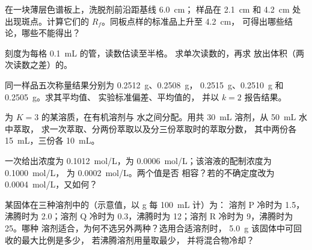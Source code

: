 \begin{exercise}[$\star$]\label{exo:b1:lab-techniques-1:3}
在一块薄层色谱板上，洗脱剂前沿距基线 \qty{6.0}{cm}；
样品在 \qty{2.1}{cm} 和 \qty{4.2}{cm} 处出现斑点。计算它们的
$R_f$。同板点样的标准品上升至 \qty{4.2}{cm}，
可得出哪些结论，哪些不能得出？
\end{exercise}

\begin{exercise}[$\star$]\label{exo:b1:lab-techniques-1:4}
刻度为每格 \qty{0.1}{mL} 的管，读数估读至半格。
求单次读数的，再求
放出体积（两次读数之差）的。
\end{exercise}

\begin{exercise}[$\star\star$]\label{exo:b1:lab-techniques-1:5}
同一样品五次称量结果分别为 \qty{0.2512}{g}、\qty{0.2508}{g}，
\qty{0.2515}{g}、\qty{0.2510}{g} 和 \qty{0.2505}{g}。求其平均值、
实验标准偏差、平均值的，
并以 $k = 2$ 报告结果。
\end{exercise}

\begin{exercise}[$\star\star$]\label{exo:b1:lab-techniques-1:6}
为 $K = 3$ 的某溶质，在有机溶剂与
水之间分配。用共 \qty{30}{mL} 溶剂，从 \qty{50}{mL} 水中萃取，
求一次萃取、分两份萃取以及分三份萃取时的萃取分数，
其中两份各 \qty{15}{mL}，三份各 \qty{10}{mL}。
\end{exercise}

\begin{exercise}[$\star\star$]\label{exo:b1:lab-techniques-1:7}
一次给出浓度为 \qty{0.1012}{mol/L}，为
\qty{0.0006}{mol/L}；该溶液的配制浓度为 \qty{0.1000}{mol/L}，
为 \qty{0.0002}{mol/L}。两个值是否
相容？若的不确定度改为
\qty{0.0004}{mol/L}，又如何？
\end{exercise}

\begin{exercise}[$\star\star$]\label{exo:b1:lab-techniques-1:8}
某固体在三种溶剂中的（示意值，以 \unit{g} 每 \qty{100}{mL} 计）为：
溶剂 P 冷时为 1.5，沸腾时为 2.0；溶剂
Q 冷时为 0.3，沸腾时为 12；溶剂 R 冷时为 9，沸腾时为 25。哪种
溶剂适合，为何不选另外两种？选用合适溶剂时，
\qty{5.0}{g} 该固体中可回收的最大比例是多少，
若沸腾溶剂用量取最少，
并将混合物冷却？
\end{exercise}

